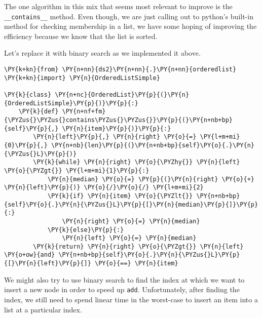 The one algorithm in this mix that seems most relevant to improve is the \texttt{\_\_contains\_\_} method.
Even though, we are just calling out to python's built-in method for checking membership in a list, we have some hoping of improving the efficiency because we know that the list is sorted.


Let's replace it with binary search as we implemented it above.

\begin{Verbatim}[commandchars=\\\{\}]
\PY{k+kn}{from} \PY{n+nn}{ds2}\PY{n+nn}{.}\PY{n+nn}{orderedlist} \PY{k+kn}{import} \PY{n}{OrderedListSimple}

\PY{k}{class} \PY{n+nc}{OrderedList}\PY{p}{(}\PY{n}{OrderedListSimple}\PY{p}{)}\PY{p}{:}
    \PY{k}{def} \PY{n+nf+fm}{\PYZus{}\PYZus{}contains\PYZus{}\PYZus{}}\PY{p}{(}\PY{n+nb+bp}{self}\PY{p}{,} \PY{n}{item}\PY{p}{)}\PY{p}{:}
        \PY{n}{left}\PY{p}{,} \PY{n}{right} \PY{o}{=} \PY{l+m+mi}{0}\PY{p}{,} \PY{n+nb}{len}\PY{p}{(}\PY{n+nb+bp}{self}\PY{o}{.}\PY{n}{\PYZus{}L}\PY{p}{)}
        \PY{k}{while} \PY{n}{right} \PY{o}{\PYZhy{}} \PY{n}{left} \PY{o}{\PYZgt{}} \PY{l+m+mi}{1}\PY{p}{:}
            \PY{n}{median} \PY{o}{=} \PY{p}{(}\PY{n}{right} \PY{o}{+} \PY{n}{left}\PY{p}{)} \PY{o}{/}\PY{o}{/} \PY{l+m+mi}{2}
            \PY{k}{if} \PY{n}{item} \PY{o}{\PYZlt{}} \PY{n+nb+bp}{self}\PY{o}{.}\PY{n}{\PYZus{}L}\PY{p}{[}\PY{n}{median}\PY{p}{]}\PY{p}{:}
                \PY{n}{right} \PY{o}{=} \PY{n}{median}
            \PY{k}{else}\PY{p}{:}
                \PY{n}{left} \PY{o}{=} \PY{n}{median}
        \PY{k}{return} \PY{n}{right} \PY{o}{\PYZgt{}} \PY{n}{left} \PY{o+ow}{and} \PY{n+nb+bp}{self}\PY{o}{.}\PY{n}{\PYZus{}L}\PY{p}{[}\PY{n}{left}\PY{p}{]} \PY{o}{==} \PY{n}{item}
\end{Verbatim}



We might also try to use binary search to find the index at which we want to insert a new node in order to speed up \texttt{add}.
Unfortunately, after finding the index, we still need to spend linear time in the worst-case to insert an item into a list at a particular index.
